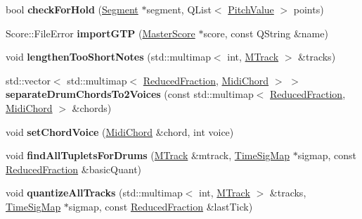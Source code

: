 \begin{DoxyCompactItemize}
bool {\bfseries check\+For\+Hold} (\hyperlink{class_ms_1_1_segment}{Segment} $\ast$segment, Q\+List$<$ \hyperlink{struct_ms_1_1_pitch_value}{Pitch\+Value} $>$ points)
\item 
\mbox{\label{namespace_ms_a2c087e3ca6b83313ca937d72193cdf05}} 
Score\+::\+File\+Error {\bfseries import\+G\+TP} (\hyperlink{class_ms_1_1_master_score}{Master\+Score} $\ast$score, const Q\+String \&name)
\item 
\mbox{\label{namespace_ms_a4540c6f9c4cdeb082945dfe86d7ccf83}} 
void {\bfseries lengthen\+Too\+Short\+Notes} (std\+::multimap$<$ int, \hyperlink{class_ms_1_1_m_track}{M\+Track} $>$ \&tracks)
\item 
\mbox{\label{namespace_ms_a6f22d62c64b169f9a557b06b3593f7bf}} 
std\+::vector$<$ std\+::multimap$<$ \hyperlink{class_ms_1_1_reduced_fraction}{Reduced\+Fraction}, \hyperlink{class_ms_1_1_midi_chord}{Midi\+Chord} $>$ $>$ {\bfseries separate\+Drum\+Chords\+To2\+Voices} (const std\+::multimap$<$ \hyperlink{class_ms_1_1_reduced_fraction}{Reduced\+Fraction}, \hyperlink{class_ms_1_1_midi_chord}{Midi\+Chord} $>$ \&chords)
\item 
\mbox{\label{namespace_ms_a11d4b824038a86ba59c4c76119d462bb}} 
void {\bfseries set\+Chord\+Voice} (\hyperlink{class_ms_1_1_midi_chord}{Midi\+Chord} \&chord, int voice)
\item 
\mbox{\label{namespace_ms_a345ba5f38d1245775f48c5133124f5d6}} 
void {\bfseries find\+All\+Tuplets\+For\+Drums} (\hyperlink{class_ms_1_1_m_track}{M\+Track} \&mtrack, \hyperlink{class_ms_1_1_time_sig_map}{Time\+Sig\+Map} $\ast$sigmap, const \hyperlink{class_ms_1_1_reduced_fraction}{Reduced\+Fraction} \&basic\+Quant)
\item 
\mbox{\label{namespace_ms_a5104ebef745083935e4c01c11742e2e8}} 
void {\bfseries quantize\+All\+Tracks} (std\+::multimap$<$ int, \hyperlink{class_ms_1_1_m_track}{M\+Track} $>$ \&tracks, \hyperlink{class_ms_1_1_time_sig_map}{Time\+Sig\+Map} $\ast$sigmap, const \hyperlink{class_ms_1_1_reduced_fraction}{Reduced\+Fraction} \&last\+Tick)
\item 
\mbox{\label{namespace_ms_a9645844c384a643fb52efd4df7fba27b}} 

\end{DoxyCompactItemize}
